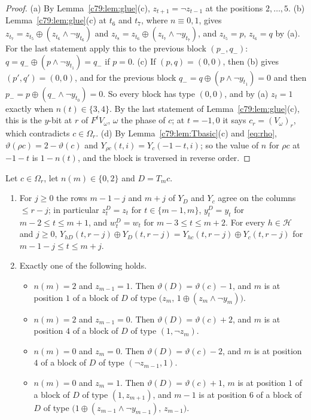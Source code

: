 \begin{proof}
(a) By Lemma~\ref{c79:lem:glue}(c), $z_{t+1}=\neg z_{t-1}$ at the positions $2,\dots,5$. (b) Lemma~\ref{c79:lem:glue}(c) at $t_6$ and $t_7$, where $n\equiv0,1$, gives $z_{t_7}=z_{t_5}\oplus(z_{t_6}\wedge\neg y_{t_6})$ and $z_{t_8}=z_{t_6}\oplus(z_{t_7}\wedge\neg y_{t_7})$, and $z_{t_5}=p$, $z_{t_6}=q$ by (a). For the last statement apply this to the previous block $(p_-,q_-)$: $q=q_-\oplus(p\wedge\neg y_{t_1})=q_-$ if $p=0$. (c) If $(p,q)=(0,0)$, then (b) gives $(p',q')=(0,0)$, and for the previous block $q_-=q\oplus(p\wedge\neg y_{t_1})=0$ and then $p_-=p\oplus(q_-\wedge\neg y_{t_0})=0$. So every block has type $(0,0)$, and by (a) $z_t=1$ exactly when $n(t)\in\{3,4\}$. By the last statement of Lemma~\ref{c79:lem:glue}(c), this is the $y$-bit at $r$ of $F^tV_{\omega}$, $\omega$ the phase of $c$; at $t=-1,0$ it says $c_r=(V_\omega)_r$, which contradicts $c\in\Omega_r$. (d) By Lemma~\ref{c79:lem:Tbasic}(c) and \eqref{eq:rho}, $\vartheta(\rho c)=2-\vartheta(c)$ and $Y_{\rho c}(t,i)=Y_c(-1-t,i)$; so the value of $n$ for $\rho c$ at $-1-t$ is $1-n(t)$, and the block is traversed in reverse order.
\end{proof}

\begin{lemma}\label{c79:lem:onemove}
Let $c\in\Omega_r$, let $n(m)\in\{0,2\}$ and $D=T_mc$.
\begin{enumerate}
\item[(a)] For $j\ge0$ the rows $m-1-j$ and $m+j$ of $Y_D$ and $Y_c$ agree on the columns $\le r-j$; in particular $z^D_t=z_t$ for $t\in\{m-1,m\}$, $y^D_t=y_t$ for $m-2\le t\le m+1$, and $w^D_t=w_t$ for $m-3\le t\le m+2$. For every $h\in\mathcal H$ and $j\ge0$, $Y_{hD}(t,r-j)\oplus Y_D(t,r-j)=Y_{hc}(t,r-j)\oplus Y_c(t,r-j)$ for $m-1-j\le t\le m+j$.
\item[(b)] Exactly one of the following holds.
\begin{itemize}
\item[$\mathrm F^-$:] $n(m)=2$ and $z_{m-1}=1$. Then $\vartheta(D)=\vartheta(c)-1$, and $m$ is at position $1$ of a block of $D$ of type $\bigl(z_m,\,1\oplus(z_m\wedge\neg y_m)\bigr)$.
\item[$\mathrm F^+$:] $n(m)=2$ and $z_{m-1}=0$. Then $\vartheta(D)=\vartheta(c)+2$, and $m$ is at position $4$ of a block of $D$ of type $(1,\neg z_m)$.
\item[$\mathrm B^-$:] $n(m)=0$ and $z_m=0$. Then $\vartheta(D)=\vartheta(c)-2$, and $m$ is at position $4$ of a block of $D$ of type $(\neg z_{m-1},1)$.
\item[$\mathrm B^+$:] $n(m)=0$ and $z_m=1$. Then $\vartheta(D)=\vartheta(c)+1$, $m$ is at position $1$ of a block of $D$ of type $(1,z_{m+1})$, and $m-1$ is at position $6$ of a block of $D$ of type $\bigl(1\oplus(z_{m-1}\wedge\neg y_{m-1}),\,z_{m-1}\bigr)$.
\end{itemize}
\end{enumerate}
\end{lemma}

